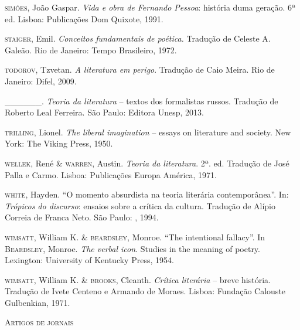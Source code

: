 \begin{hangparas}{.35in}{1}
\textsc{simões}, João Gaspar. \emph{Vida e obra de Fernando Pessoa}:
história duma geração. 6ª ed. Lisboa: Publicações Dom Quixote, 1991.

\textsc{staiger}, Emil. \emph{Conceitos fundamentais de poética.}
Tradução de Celeste A. Galeão. Rio de Janeiro: Tempo Brasileiro, 1972.

\textsc{todorov, T}zvetan. \emph{A literatura em perigo}. Tradução de
Caio Meira. Rio de Janeiro: Difel, 2009.

\_\_\_\_\_\_. \emph{Teoria da literatura} -- textos dos formalistas
russos. Tradução de Roberto Leal Ferreira. São Paulo: Editora Unesp,
2013.

\textsc{trilling}, Lionel. \emph{The liberal imagination} -- essays on
literature and society. New York: The Viking Press, 1950.

\textsc{wellek,} René \textsc{\& warren,} Austin. \emph{Teoria da
literatura}. 2ª. ed. Tradução de José Palla e Carmo. Lisboa: Publicações
Europa América, 1971.

\textsc{white}, Hayden. ``O momento absurdista na teoria literária
contemporânea''. In: \emph{Trópicos do discurso}: ensaios sobre a
crítica da cultura. Tradução de Alípio Correia de Franca Neto. São
Paulo: , 1994.

\textsc{wimsatt}, William K. \& \textsc{beardsley}, Monroe. ``The
intentional fallacy''. In \textsc{Beardsley}, Monroe. \emph{The verbal
icon}. Studies in the meaning of poetry. Lexington: University of
Kentucky Press, 1954.

\textsc{wimsatt}, William K. \& \textsc{brooks}, Cleanth. \emph{Crítica
literária} -- breve história. Tradução de Ivete Centeno e Armando de
Moraes. Lisboa: Fundação Calouste Gulbenkian, 1971.
\end{hangparas}

\pagebreak

\textsc{Artigos de jornais}\\

